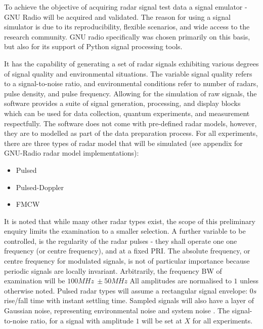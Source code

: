 To achieve the objective of acquiring radar signal test data a signal emulator - GNU Radio \cite{gnu_radio_contributors_gnu_2022} will be acquired and validated. 
The reason for using a signal simulator is due to its reproducibility, flexible scenarios, and wide access to the research community.
GNU radio specifically was chosen primarily on this basis, but also for its support of Python signal processing tools.

It has the capability of generating a set of radar signals exhibiting various degrees of signal quality and environmental situations. 
The variable signal quality refers to a signal-to-noise ratio, and environmental conditions refer to number of radars, pulse density, and pulse frequency.
Allowing for the simulation of raw signals, the software provides a suite of signal generation, processing, and display blocks which can be used for data collection, quantum experiments, and measurement respectfully.
The software does not come with pre-defined radar models, however, they are to modelled as part of the data preparation process.
For all experiments, there are three types of radar model that will be simulated (see appendix for GNU-Radio radar model implementations):
\begin{itemize}
    \item Pulsed
    \item Pulsed-Doppler
    \item \ac{FMCW}
\end{itemize}
It is noted that while many other radar types exist, the scope of this preliminary enquiry limits the examination to a smaller selection.
A further variable to be controlled, is the regularity of the radar pulses - they shall operate one one frequency (or centre frequency), and at a fixed \ac{PRI}.
The absolute frequency, or centre frequency for modulated signals, is not of particular importance because periodic signals are locally invariant.
Arbitrarily, the frequency \ac{BW} of examination will be \(100MHz\ \pm 50MHz\)
All amplitudes are normalised to \(1\) unless otherwise noted.
Pulsed radar types will assume a rectangular signal envelope: \(0s\) rise/fall time with instant settling time.
Sampled signals will also have a layer of Gaussian noise, representing environmental noise and system noise .
The signal-to-noise ratio, for a signal with amplitude \(1\) will be set at \textbf{\(X\)} for all experiments.

